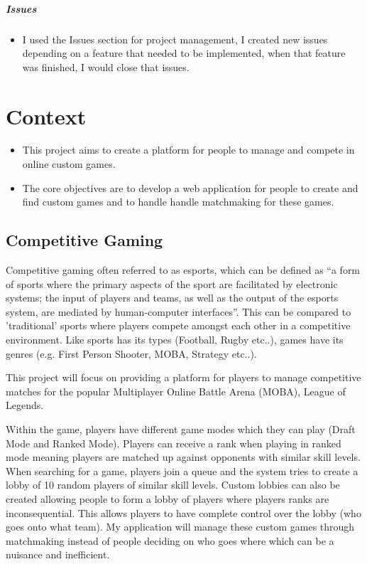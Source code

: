 \paragraph{Issues}
\begin{itemize}
	\item I used the Issues section for project management, I created new issues depending on a feature that needed to be implemented, when that feature was finished, I would close that issues.
\end{itemize}
\chapter{Context}
\begin{itemize}
	\item This project aims to create a platform for people to manage and compete in online custom games.
	\item The core objectives are to develop a web application for people to create and find custom games and to handle handle matchmaking for these games.
\end{itemize}

\section{Competitive Gaming}
Competitive gaming often referred to as esports, which can be defined as \cite{sjoblom2019esports} “a form of sports where the primary aspects of the sport are facilitated by electronic systems; the input of players and teams, as well as the output of the esports system, are mediated by human-computer interfaces”. This can be compared to 'traditional' sports where players compete amongst each other in a competitive environment. Like sports has its types (Football, Rugby etc..), games have its genres (e.g. First Person Shooter, MOBA, Strategy etc..).\newline


This project will focus on providing a platform for players to manage competitive matches for the popular Multiplayer Online Battle Arena (MOBA), League of Legends.\newline

Within the game, players have different game modes which they can play
(Draft Mode and Ranked Mode). Players can receive a rank when playing in ranked mode meaning players are matched up against opponents with similar skill levels. When searching for a game, players join a queue and the system tries to create a lobby of 10 random players of similar skill levels. Custom lobbies can also be created allowing people to form a lobby of players where players ranks are inconsequential. This allows players to have complete control over the lobby (who goes onto what team). My application will manage these custom games through matchmaking instead of people deciding on who goes where which can be a nuisance and inefficient.


